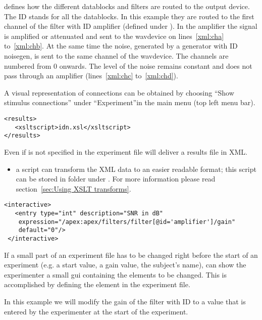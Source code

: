 
 defines how the different datablocks and
filters are routed to the output device. The ID  stands
for all the datablocks. In this example they are routed to the
first channel of the filter with ID {amplifier} (defined under
). In the amplifier the signal is amplified or
attenuated and sent to the wavdevice on lines~\ref{xml:cha}
to~\ref{xml:chb}. At the same time the noise, generated by a
generator with ID noisegen, is sent to the same channel of the
wavdevice. The channels are numbered from 0 onwards. The level of
the noise remains constant and does not pass through an amplifier
(lines~\ref{xml:chc} to~\ref{xml:chd}).

A visual representation of connections can be obtained by choosing
``Show stimulus connections'' under ``Experiment''in the main
\apex menu (top left menu bar).


\begin{lstlisting}
<results>
   <xsltscript>idn.xsl</xsltscript>
</results>
\end{lstlisting}

Even if  is not specified in the experiment file
\apex will deliver a results file in XML.
\begin{itemize}
\item {}  a script can transform the XML data to
an easier readable format; this script can be stored in folder
 under \apex. For more information please read
section~\ref{sec:Using XSLT transforms}.
\end{itemize}
 

\begin{lstlisting}
<interactive>
   <entry type="int" description="SNR in dB"
    expression="/apex:apex/filters/filter[@id='amplifier']/gain"
    default="0"/>
 </interactive>
\end{lstlisting}

If a small part of an experiment file has to be changed right
before the start of an experiment (e.g. a start value, a gain
value, the subject's name), \apex can show the experimenter a
small \ac{gui} containing the elements to be changed. This is
accomplished by defining the  element in the
experiment file.

In this example we will modify the gain of the filter with ID
 to a value that is entered by the experimenter at
the start of the experiment.

